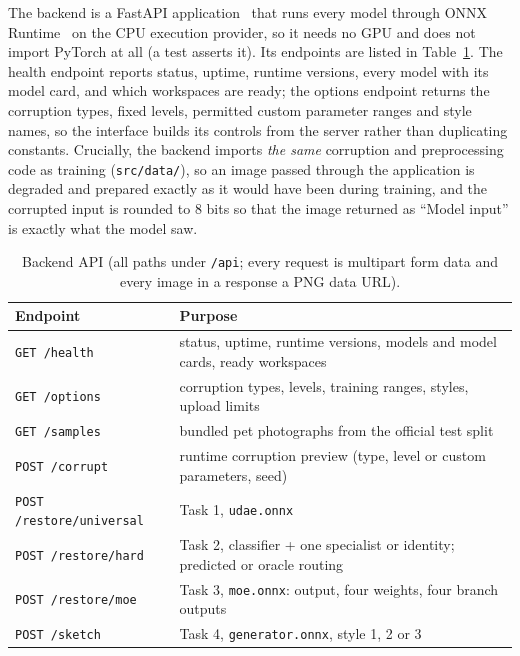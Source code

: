 \documentclass[conference]{IEEEtran}
\begin{document}
The backend is a FastAPI application~\cite{fastapi} that runs every model through
ONNX Runtime~\cite{onnxruntime} on the CPU execution provider, so it needs no GPU
and does not import PyTorch at all (a test asserts it). Its endpoints are listed in
Table~\ref{tab:endpoints}. The health endpoint reports status, uptime, runtime
versions, every model with its model card, and which workspaces are ready; the
options endpoint returns the corruption types, fixed levels, permitted custom
parameter ranges and style names, so the interface builds its controls from the
server rather than duplicating constants. Crucially, the backend imports
\emph{the same} corruption and preprocessing code as training
(\texttt{src/data/}), so an image passed through the application is degraded and
prepared exactly as it would have been during training, and the corrupted input
is rounded to 8 bits so that the image returned as ``Model input'' is exactly
what the model saw.

\begin{table}[t]
\caption{Backend API (all paths under \texttt{/api}; every request is multipart
form data and every image in a response a PNG data URL).}
\label{tab:endpoints}
\centering
\footnotesize
\setlength{\tabcolsep}{3pt}
\begin{tabular}{@{}l>{\raggedright\arraybackslash}p{4.55cm}@{}}
\toprule
Endpoint & Purpose \\
\midrule
\texttt{GET /health} & status, uptime, runtime versions, models and model cards, ready workspaces \\
\texttt{GET /options} & corruption types, levels, training ranges, styles, upload limits \\
\texttt{GET /samples} & bundled pet photographs from the official test split \\
\texttt{POST /corrupt} & runtime corruption preview (type, level or custom parameters, seed) \\
\texttt{POST /restore/universal} & Task 1, \texttt{udae.onnx} \\
\texttt{POST /restore/hard} & Task 2, classifier + one specialist or identity; predicted or oracle routing \\
\texttt{POST /restore/moe} & Task 3, \texttt{moe.onnx}: output, four weights, four branch outputs \\
\texttt{POST /sketch} & Task 4, \texttt{generator.onnx}, style 1, 2 or 3 \\
\bottomrule
\end{tabular}
\end{table}
\end{document}
